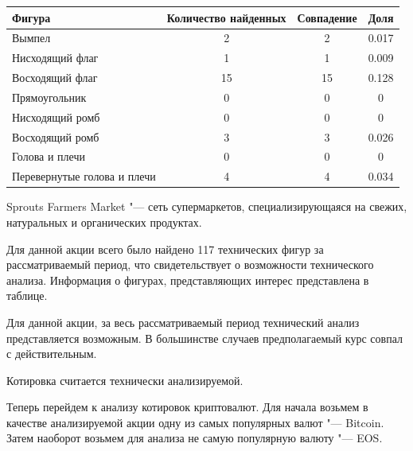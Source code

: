 \documentclass[bachelor, och, coursework]{SCWorks}
\begin{document}
        \begin{table}[!hbt]
            \centering
            \begin{tabular}{|l|c|c|c|}
            \hline
            Фигура                      & \multicolumn{1}{l|}{Количество найденных} & Совпадение & Доля  \\ \hline
            Вымпел                      & 2                                         & 2          & 0.017 \\ \hline
            Нисходящий флаг             & 1                                         & 1          & 0.009 \\ \hline
            Восходящий флаг             & 15                                        & 15         & 0.128 \\ \hline
            Прямоугольник               & 0                                         & 0          & 0     \\ \hline
            Нисходящий ромб             & 0                                         & 0          & 0     \\ \hline
            Восходящий ромб             & 3                                         & 3          & 0.026 \\ \hline
            Голова и плечи              & 0                                         & 0          & 0     \\ \hline
            Перевернутые голова и плечи & 4                                         & 4          & 0.034 \\ \hline
            \end{tabular}
            \end{table}
    
        
            Sprouts Farmers Market "--- сеть супермаркетов, специализирующаяся 
            на свежих, натуральных и органических продуктах.
    
        
        Для данной акции всего было найдено 117 технических фигур за 
        рассматриваемый период, что свидетельствует о возможности технического 
        анализа. Информация о фигурах, представляющих интерес представлена в 
        таблице.
        
        Для данной акции, за весь рассматриваемый период технический анализ 
        представляется возможным. В большинстве случаев предполагаемый курс 
        совпал с действительным.
        
        Котировка считается технически анализируемой.

        Теперь перейдем к анализу котировок криптовалют. Для начала возьмем в
        качестве анализируемой акции одну из самых популярных валют "--- 
        Bitcoin. Затем наоборот возьмем для анализа не самую популярную валюту
        "--- EOS.
\end{document}
